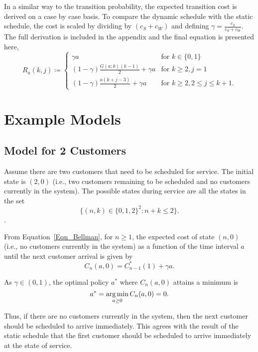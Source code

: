 In a similar way to the transition probability, the expected transition cost is derived on a case by case basis. To compare the dynamic schedule with the static schedule, the cost is scaled by dividing by $(c_{S} + c_{W})$ and defining $\gamma = \frac{c_{S}}{c_{S} + c_{W}}$. The full derivation is included in the appendix and the final equation is presented here,
\begin{equation}
	R_{a} (k, j) \coloneqq \begin{cases}
		\gamma a & \text{for $k \in \{ 0, 1 \}$} \\
		(1 - \gamma) \frac{G (a; k) (k - 1)}{2} + \gamma a & \text{for $k \geq 2, j = 1$} \\
		(1 - \gamma) \frac{a (k + j - 3)}{2} + \gamma a & \text{for $k \geq 2, 2 \leq j \leq k + 1$}.
	\end{cases}
\end{equation}

\section{Example Models}
\subsection{Model for 2 Customers}
Assume there are two customers that need to be scheduled for service. The initial state is $(2, 0)$ (i.e., two customers remaining to be scheduled and no customers currently in the system). The possible states during service are all the states in the set
\begin{equation}
	\Big\{ (n, k) \in \{ 0, 1, 2 \}^{2} : n + k \leq 2 \Big\}.
\end{equation}.

From Equation~\ref{Eqn_Bellman}, for $n \geq 1$, the expected cost of state $(n, 0)$ (i.e., no customers currently in the system) as a function of the time interval $a$ until the next customer arrival is given by
\begin{equation}
	C_{n} (a, 0) = C_{n - 1}^{*} (1) + \gamma a.
\end{equation}

As $\gamma \in (0, 1)$, the optimal policy $a^{*}$ where $C_{n} (a, 0)$ attains a minimum is
\begin{equation}
	a^{*} = \operatorname*{arg\,min}_{a \geq 0} C_{n} (a, 0) = 0.
	\label{eqn:Dynamic_No_Waiting}
\end{equation}

Thus, if there are no customers currently in the system, then the next customer should be scheduled to arrive immediately. This agrees with the result of the static schedule that the first customer should be scheduled to arrive immediately at the state of service.

